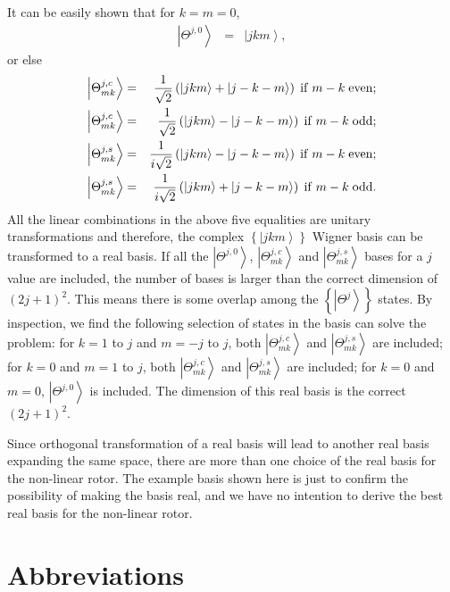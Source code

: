 \documentclass[12pt]{iopart}
\begin{document}
It can be easily shown that for $k=m=0$,
\begin{eqnarray}
\left| \Theta^{j,0} \right>&=&\left|jkm \right>,
\end{eqnarray}
or else
\begin{eqnarray}
\left| \Theta^{j,c}_{mk} \right>&=&\frac{1}{\sqrt{2}}\left( \left|jkm \right>+\left|j -k -m \right> \right) \; {\rm if} \; m-k \; {\rm even};\\
\left| \Theta^{j,c}_{mk} \right>&=&\frac{1}{\sqrt{2}}\left( \left|jkm \right>-\left|j -k -m \right> \right) \; {\rm if} \; m-k \; {\rm odd};\\
\left| \Theta^{j,s}_{mk} \right>&=&\frac{1}{i\sqrt{2}}\left( \left|jkm \right>-\left|j -k -m \right> \right) \; {\rm if} \; m-k \; {\rm even};\\
\left| \Theta^{j,s}_{mk} \right>&=&\frac{1}{i\sqrt{2}}\left( \left|jkm \right>+\left|j -k -m \right> \right) \; {\rm if} \; m-k \; {\rm odd}.
\end{eqnarray}
All the linear combinations in the above five equalities are unitary transformations and therefore, the complex $\left\{\left|jkm \right>\right\}$ Wigner basis can be transformed to a real basis. If all the $\left| \Theta^{j,0} \right>$, $\left| \Theta^{j,c}_{mk} \right>$ and $\left| \Theta^{j,s}_{mk} \right>$ bases for a $j$ value are included, the number of bases is larger than the correct dimension of $\left(2j+1 \right)^2$. This means there is some overlap among the $\left\{ \left| \Theta^j \right>\right\}$ states. By inspection, we find the following selection of states in the basis can solve the problem: for $k=1$ to $j$ and $m=-j$ to $j$, both $\left| \Theta^{j,c}_{mk} \right>$ and $\left| \Theta^{j,s}_{mk} \right>$ are included; for $k=0$ and $m=1$ to $j$, both $\left| \Theta^{j,c}_{mk} \right>$ and $\left| \Theta^{j,s}_{mk} \right>$ are included; for $k=0$ and $m=0$, $\left| \Theta^{j,0} \right>$ is included. The dimension of this real basis is the correct $\left(2j+1 \right)^2$.

Since orthogonal transformation of a real basis will lead to another real basis expanding the same space, there are more than one choice of the real basis for the non-linear rotor. The example basis shown here is just to confirm the possibility of making the basis real, and we have no intention to derive the best real basis for the non-linear rotor.

\section*{Abbreviations}
\end{document}
